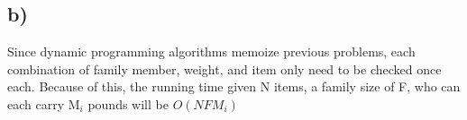 \documentclass{article}
\begin{document}
\subsection*{b)}

Since dynamic programming algorithms memoize previous problems, each combination of family member, weight, and item only need to be checked once each.  Because of this, the running time given N items, a family size of F, who can each carry M$_i$ pounds will be $O(NFM_i)$
\end{document}
